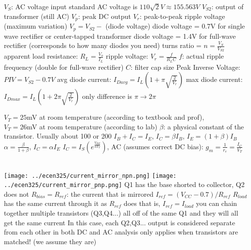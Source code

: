 \documentclass[12pt]{article}
\begin{document}
\begin{spacing}{0.8}
\begin{multicols*}{2}
\begin{flushleft}
\begin{outline}[longenum]
  \1 $V_S$: AC voltage input
    \2 standard AC voltage is $110\sqrt{2}V \approx155.563V$
  \1 $V_{S2}$: output of transformer (still AC)
  \1 $V_p$: peak DC output
  \2 $V_r$: peak-to-peak ripple voltage (maximum variation)
  \1 $V_p=V_{S2}-$ (diode voltage)
    \2 diode voltage = 0.7V for single wave rectifier or center-tapped transformer
    \2 diode voltage = 1.4V for full-wave rectifier
    \2 (corresponds to how many diodes you need)
  \1 turns ratio = $n=\frac{V_S}{V_{S2}}$
  \1 apparent load resistance: $R_L = \frac{V_o}{I_L}$
  \1 ripple voltage: $V_r=\frac{f}{R_L C}$
    \2 $f$: actual ripple frequency (double for full-wave rectifier)
    \2 $C$: filter cap size
  \1 Peak Inverse Voltage: $ PIV = V_{S2}-0.7V$
  \1 avg diode current: $I_{Davg}=I_L \left( 1+\pi\sqrt{\frac{2}{V_r}} \right)$
  \1 max diode current: $I_{Dmax}=I_L \left( 1+2\pi\sqrt{\frac{2}{V_r}} \right)$
    \2 only difference is $\pi \rightarrow 2\pi$

  \1 $V_T = 25$mV at room temperature (according to textbook and prof),
  \\ $V_T = 26$mV at room temperature (according to lab)
  \1 $\beta$: a physical constant of the transistor. Usually about 100 or 200
  \1 
    $I_B + I_C = I_E$, 
    $I_C = \beta I_B$,
    $I_E = (1+\beta) I_B$
  \1
    $\alpha = \frac{\beta}{1+\beta}$,
    $I_C = \alpha I_E$
  \1
    $I_C = I_S ( e^{\frac{V_{BE}}{n V_T}} )$,
  \1 AC (assumes correct DC bias):
    $g_m = \frac{1}{r_e} = \frac{I_C}{V_T}$

\\
\texttt{[image: ../ecen325/current\_mirror\_npn.png]}
\texttt{[image: ../ecen325/current\_mirror\_pnp.png]}
  \1 Q1 has the base shorted to collector, Q2 does not
  \1 $R_{bias}=R_{ref}$: the current that is mirrored
  \1 $I_{ref}=(V_{CC}-0.7)/R_{ref}$
  \1 $R_{load}$ has the same current through it as $R_{ref}$ does
    \2 that is, $I_{ref} = I_{load}$
  \1 you can chain together multiple transistors (Q3,Q4...) all off of
    the same Q1 and they will all get the same current
    \2 In this case, each Q2,Q3... output is considered separate from each other
      in both DC and AC analysis
  \1 only applies when transistors are matched! (we assume they are)


\end{outline}
\end{flushleft}
\end{multicols*}
\end{spacing}
\end{document}
